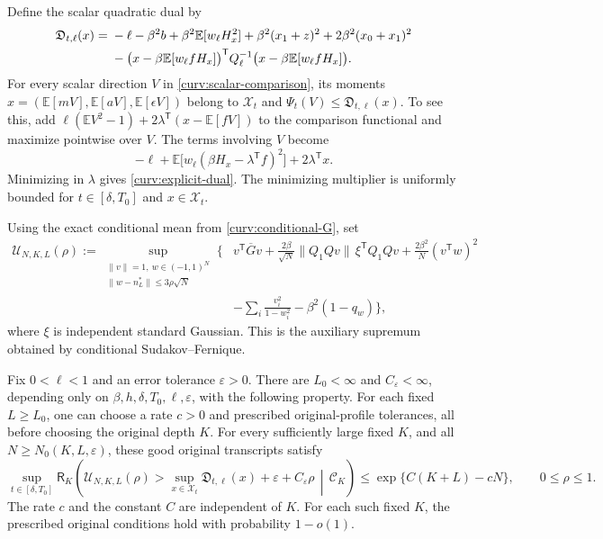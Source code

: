 \documentclass[11pt,reqno]{amsart}
\begin{document}
Define the scalar quadratic dual by
\begin{align}
 \mathfrak D_{t,\ell}(x)
 ={}&-\ell-\beta^2b+\beta^2\mathbb E[w_\ell H_x^2]
       +\beta^2(x_1+z)^2+2\beta^2(x_0+x_1)^2\notag\\
 &-\bigl(x-\beta\mathbb E[w_\ell fH_x]\bigr)^{\mathsf T}
       Q_\ell^{-1}\bigl(x-\beta\mathbb E[w_\ell fH_x]\bigr).
 \label{curv:explicit-dual}
\end{align}
For every scalar direction $V$ in \eqref{curv:scalar-comparison}, its
moments $x=(\mathbb E[mV],\mathbb E[aV],\mathbb E[\epsilon V])$ belong
to $\mathcal X_t$ and
$\Psi_t(V)\le\mathfrak D_{t,\ell}(x)$. To see this, add
$\ell(\mathbb EV^2-1)+2\lambda^{\mathsf T}(x-\mathbb E[fV])$ to the
comparison functional and maximize pointwise over $V$. The terms
involving $V$ become
\[
 -\ell+\mathbb E\bigl[w_\ell(\beta H_x-\lambda^{\mathsf T}f)^2\bigr]
                +2\lambda^{\mathsf T}x.
\]
Minimizing in $\lambda$ gives \eqref{curv:explicit-dual}. The minimizing
multiplier is uniformly bounded for $t\in[\delta,T_0]$ and
$x\in\mathcal X_t$.

Using the exact conditional mean from \eqref{curv:conditional-G}, set
\begin{align*}
 \mathscr U_{N,K,L}(\rho)
 :=\sup_{\substack{\|v\|=1,\ w\in(-1,1)^N\\
                         \|w-n_L^*\|\le3\rho\sqrt N}}
 \bigg\{&v^{\mathsf T}\overline Gv
       +\frac{2\beta}{\sqrt N}\|Q_1Qv\|\,\xi^{\mathsf T}Q_1Qv
       +\frac{2\beta^2}{N}(v^{\mathsf T}w)^2\\
       &-\sum_i\frac{v_i^2}{1-w_i^2}
       -\beta^2(1-q_w)\bigg\},
\end{align*}
where $\xi$ is independent standard Gaussian. This is the auxiliary
supremum obtained by conditional Sudakov--Fernique.

\begin{lem}\label{curv:finite-dual-lemma}
Fix $0<\ell<1$ and an error tolerance $\varepsilon>0$. There are
$L_0<\infty$ and $C_\varepsilon<\infty$, depending only on
$\beta,h,\delta,T_0,\ell,\varepsilon$, with the following property.
For each fixed $L\ge L_0$, one can choose a rate $c>0$ and prescribed
original-profile tolerances, all before choosing the original depth
$K$. For every sufficiently large fixed $K$, and all
$N\ge N_0(K,L,\varepsilon)$, these good original transcripts satisfy
\begin{equation}\label{curv:finite-dual-bound}
 \sup_{t\in[\delta,T_0]}
 \mathsf R_K\!\left(
   \mathscr U_{N,K,L}(\rho)>
      \sup_{x\in\mathcal X_t}\mathfrak D_{t,\ell}(x)
             +\varepsilon+C_\varepsilon\rho
           \,\middle|\,\mathcal C_K\right)
       \le \exp\{C(K+L)-cN\},\qquad 0\le\rho\le1.
\end{equation}
The rate $c$ and the constant $C$ are independent of $K$. For each such
fixed $K$, the prescribed original conditions hold with probability
$1-o(1)$.
\end{lem}
\end{document}

